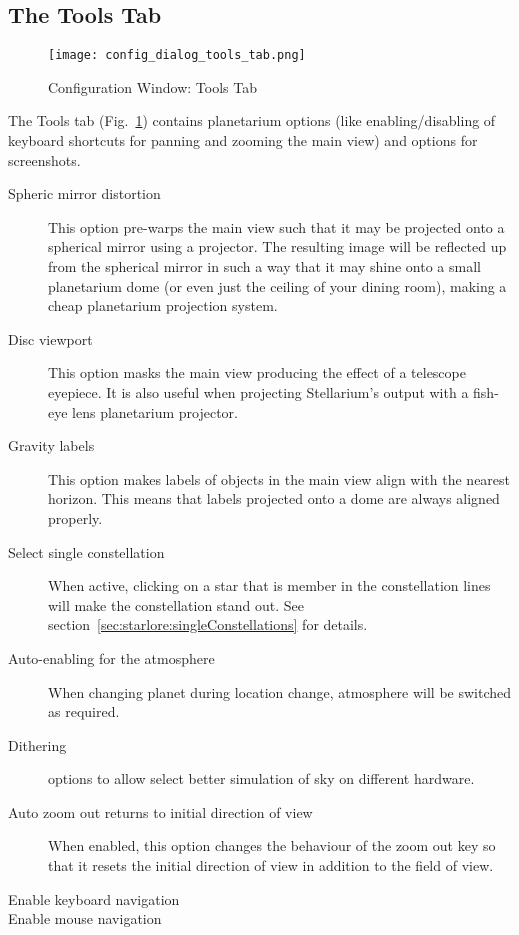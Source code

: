 \subsection{The Tools Tab}
\label{sec:gui:configuration:tools}

\begin{figure}[htbp]
\centering\texttt{[image: config\_dialog\_tools\_tab.png]}
\caption{Configuration Window: Tools Tab}
\label{fig:gui:configuration:tools}
\end{figure}

The Tools tab (Fig.~\ref{fig:gui:configuration:tools}) contains planetarium options (like enabling/disabling of keyboard shortcuts for panning and zooming the main view) and options for screenshots.

\begin{description}
\item[Spheric mirror distortion] This option pre-warps the main view
  such that it may be projected onto a spherical mirror using a
  projector. The resulting image will be reflected up from the spherical
  mirror in such a way that it may shine onto a small planetarium
  dome (or even just the ceiling of your dining room), making a cheap planetarium projection system.
\item[Disc viewport] This option masks the main view
  producing the effect of a telescope eyepiece. It is also useful when
  projecting Stellarium's output with a fish-eye lens planetarium
  projector.
\item[Gravity labels] This option makes labels of objects in the
  main view align with the nearest horizon. This means that labels
  projected onto a dome are always aligned properly.
\item[Select single constellation] When active, clicking on a star
  that is member in the constellation lines will make the
  constellation stand out. See section~\ref{sec:starlore:singleConstellations} for details.
\item[Auto-enabling for the atmosphere] When changing planet during
  location change, atmosphere will be switched as required.
\item[Dithering] options to allow select better simulation of sky on different hardware.
\item[Auto zoom out returns to initial direction of view] When enabled,
  this option changes the behaviour of the zoom out key
  \key{\textbackslash{}} so that it resets the initial direction of view in
  addition to the field of view.
\item[Enable keyboard navigation]
\item[Enable mouse navigation]


\end{description}
